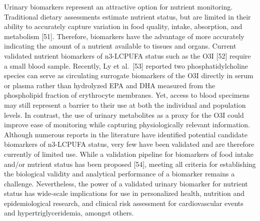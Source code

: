 \documentclass[journal=jacsat,manuscript=article]{achemso}
\begin{document}
Urinary biomarkers represent an attractive option for nutrient
monitoring. Traditional dietary assessments estimate nutrient status,
but are limited in their ability to accurately capture variation in food
quality, intake, absorption, and metabolism {[}51{]}. Therefore,
biomarkers have the advantage of more accurately indicating the amount
of a nutrient available to tissues and organs. Current validated
nutrient biomarkers of n3-LCPUFA status such as the O3I {[}52{]} require
a small blood sample. Recently, Ly et al.~{[}53{]} reported two
phosphatidylcholine species can serve as circulating surrogate
biomarkers of the O3I directly in serum or plasma rather than hydrolyzed
EPA and DHA measured from the phospholipid fraction of erythrocyte
membranes. Yet, access to blood specimens may still represent a barrier
to their use at both the individual and population levels. In contrast,
the use of urinary metabolites as a proxy for the O3I could improve ease
of monitoring while capturing physiologically relevant information.
Although numerous reports in the literature have identified potential
candidate biomarkers of n3-LCPUFA status, very few have been validated
and are therefore currently of limited use. While a validation pipeline
for biomarkers of food intake and/or nutrient status has been proposed
{[}54{]}, meeting all criteria for establishing the biological validity
and analytical performance of a biomarker remains a challenge.
Nevertheless, the power of a validated urinary biomarker for nutrient
status has wide-scale implications for use in personalized health,
nutrition and epidemiological research, and clinical risk assessment for
cardiovascular events and hypertriglyceridemia, amongst others.
\end{document}
